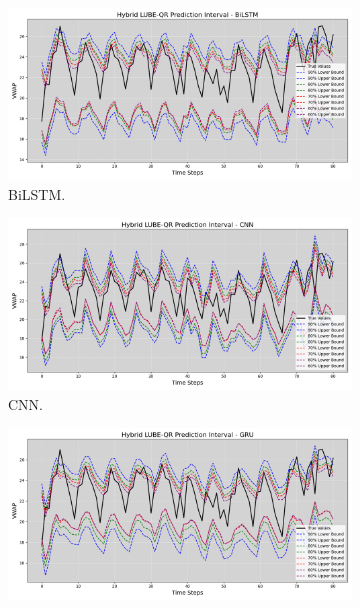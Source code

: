 \begin{figure}[H]
    \centering
        \begin{minipage}{0.50\textwidth}
            \centering
            \begin{subfigure}[b]{\textwidth}
                \centering
                \includegraphics[width=\textwidth]{Chap03/figs/Hybrid_LUBE_QR_AllConfidence_web_traffic_BiLSTM.png}
                \caption{BiLSTM.}
            \end{subfigure}
            \hfill
            \begin{subfigure}[b]{\textwidth}
                \centering
                \includegraphics[width=\textwidth]{Chap03/figs/Hybrid_LUBE_QR_AllConfidence_web_traffic_CNN.png}
                \caption{CNN.}
            \end{subfigure}
            \begin{subfigure}[b]{\textwidth}
                \centering
                \includegraphics[width=\textwidth]{Chap03/figs/Hybrid_LUBE_QR_AllConfidence_web_traffic_GRU.png}

\end{subfigure}
\end{minipage}
\end{figure}
